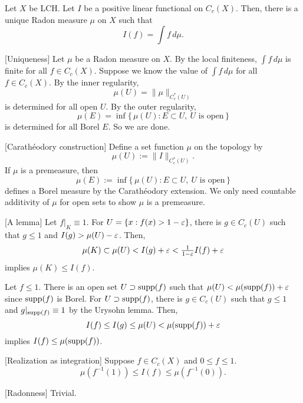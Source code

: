 \documentclass{../exp}
\begin{document}
\begin{thm}
Let $X$ be LCH.
Let $I$ be a positive linear functional on $C_c(X)$.
Then, there is a unique Radon measure $\mu$ on $X$ such that
\[I(f)=\int f\,d\mu.\]
\end{thm}
\begin{pf}
[Uniqueness]
Let $\mu$ be a Radon measure on $X$.
By the local finiteness, $\int f\,d\mu$ is finite for all $f\in C_c(X)$.
Suppose we know the value of $\int f\,d\mu$ for all $f\in C_c(X)$.
By the inner regularity,
\[\mu(U)=\|\mu\|_{C_c^*(U)}\]
is determined for all open $U$.
By the outer regularity,
\[\mu(E)=\inf\{\,\mu(U):E\subset U,\ U\text{ is open}\,\}\]
is determined for all Borel $E$.
So we are done.

[Carath\'eodory construction]
Define a set function $\mu$ on the topology by
\[\mu(U):=\|I\|_{C_c^*(U)}.\]
If $\mu$ is a premeasure, then
\[\mu(E):=\inf\{\,\mu(U):E\subset U,\ U\text{ is open}\,\}\]
defines a Borel measure by the Carath\'eodory extension.
We only need countable additivity of $\mu$ for open sets to show $\mu$ is a premeasure.

[A lemma]
Let $f|_K\equiv1$.
For $U=\{x:f(x)>1-\varepsilon\}$, there is $g\in C_c(U)$ such that $g\le1$ and $I(g)>\mu(U)-\varepsilon$.
Then,
\[\mu(K)\subset\mu(U)<I(g)+\varepsilon<\tfrac1{1-\varepsilon}I(f)+\varepsilon\]
implies $\mu(K)\le I(f)$.

Let $f\le1$.
There is an open set $U\supset\operatorname{supp}(f)$ such that $\mu(U)<\mu(\operatorname{supp}(f))+\varepsilon$ since $\operatorname{supp}(f)$ is Borel.
For $U\supset\operatorname{supp}(f)$, there is $g\in C_c(U)$ such that $g\le1$ and $g|_{\operatorname{supp}(f)}\equiv1$ by the Urysohn lemma.
Then,
\[I(f)\le I(g)\le\mu(U)<\mu(\operatorname{supp}(f))+\varepsilon\]
implies $I(f)\le\mu(\operatorname{supp}(f))$.

[Realization as integration]
Suppose $f\in C_c(X)$ and $0\le f\le1$.
\[\mu(f^{-1}(1))\le I(f)\le\mu(f^{-1}(0)).\]


[Radonness]
Trivial.


\end{pf}
\end{document}
